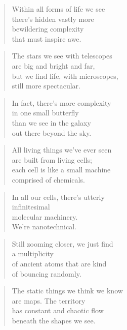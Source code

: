\documentclass[14pt,a4paper]{article}
\begin{document}
\begin{verse}
Within all forms of life we see\\
there’s hidden vastly more\\
bewildering complexity\\
that must inspire awe.
\end{verse}

\begin{verse}
The stars we see with telescopes\\
are big and bright and far,\\
but we find life, with microscopes,\\
still more spectacular.
\end{verse}

\begin{verse}
In fact, there’s more complexity\\
in one small butterfly\\
than we see in the galaxy\\
out there beyond the sky.
\end{verse}

\begin{verse}
All living things we’ve ever seen\\
are built from living cells;\\
each cell is like a small machine\\
comprised of chemicals.
\end{verse}

\begin{verse}
In all our cells, there’s utterly\\
infinitesimal\\
molecular machinery.\\
We’re nanotechnical.
\end{verse}

\begin{verse}
Still zooming closer, we just find\\
a multiplicity\\
of ancient atoms that are kind\\
of bouncing randomly.
\end{verse}

\begin{verse}
The static things we think we know\\
are maps. The territory\\
has constant and chaotic flow\\
beneath the shapes we see.
\end{verse}
\end{document}
